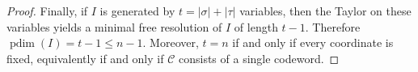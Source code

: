 \documentclass[10pt,a4paper]{amsart}
\DeclareMathOperator{\pd}{pdim}
\newcommand{\C}{\mathcal{C}}
\begin{document}
\begin{proof}
Finally, if $I$ is generated by $t=|\sigma|+|\tau|$ variables, then the Taylor on these variables
yields a  minimal free resolution of $I$ of
length $t-1$. Therefore $\pd(I)=t-1\le n-1$. Moreover, $t=n$ if and only if every coordinate is fixed,
equivalently if and only if $\C$ consists of a single codeword.
\end{proof}
\end{document}
